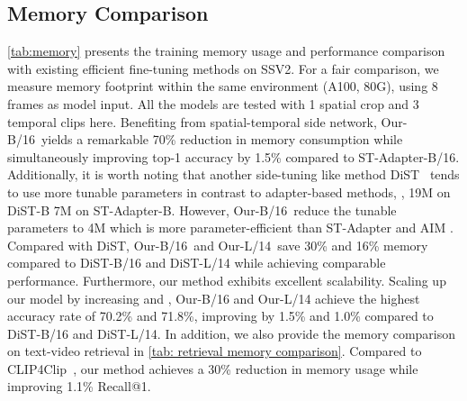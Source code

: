 \documentclass[10pt,twocolumn,letterpaper]{article}
\begin{document}
\subsection{Memory Comparison}
\label{subsec: memory comparison}
\cref{tab:memory} presents the training memory usage and performance comparison with existing efficient fine-tuning methods on SSV2. For a fair comparison, we measure memory footprint within the same environment (A100, 80G), using 8 frames as model input. All the models are tested with 1 spatial crop and 3 temporal clips here. Benefiting from spatial-temporal side network, Our-B/16\faLightbulbO~yields a remarkable 70\% reduction in memory consumption while simultaneously improving top-1 accuracy by 1.5\% compared to ST-Adapter-B/16. Additionally, it is worth noting that another side-tuning like method DiST~\cite{dist} tends to use more tunable parameters in contrast to adapter-based methods, \ie, 19M on DiST-B \vs 7M on ST-Adapter-B. However, Our-B/16\faLightbulbO~reduce the tunable parameters to 4M which is more parameter-efficient than ST-Adapter \cite{st_adapter} and AIM \cite{aim}. Compared with DiST, Our-B/16\faLightbulbO~and Our-L/14\faLightbulbO~save 30\% and 16\% memory compared to DiST-B/16 and DiST-L/14 while achieving comparable performance. Furthermore, our method exhibits excellent scalability. Scaling up our model by increasing  and , Our-B/16 and Our-L/14 achieve the highest accuracy rate of 70.2\% and 71.8\%, improving by 1.5\% and 1.0\% compared to DiST-B/16 and DiST-L/14. In addition, we also provide the memory comparison on text-video retrieval in \cref{tab: retrieval memory comparison}. Compared to CLIP4Clip~\cite{clip4clip}, our method achieves a 30\% reduction in memory usage while improving 1.1\% Recall@1.

\begin{table}
  \centering
  \caption{Model configurations. We probe the performance of our model at various scales by manipulating its dimensions and the number of layers. \faLightbulbO~denotes the lightweight version.}
  \label{tab:model}
\end{table}
\end{document}
